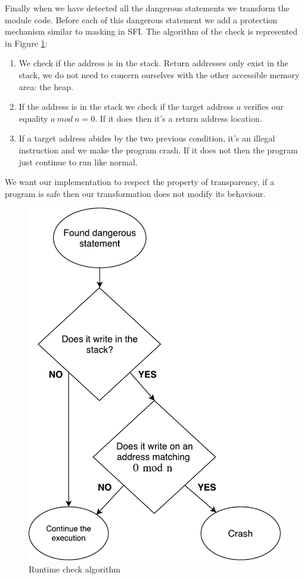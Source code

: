 \documentclass[11pt]{sdm}
\begin{document}
Finally when we have detected all the dangerous statements we transform the module code. Before each of this dangerous statement we add a protection mechanism similar to masking in SFI. The algorithm of the check is represented in Figure \ref{runtime_check}: \\
	\begin{enumerate}
		\item We check if the address is in the stack. Return addresses only exist in the stack, we do not need to concern ourselves with the other accessible memory area: the heap.
		\item If the address is in the stack we check if the target address $a$ verifies our equality $a~mod~n=0$. If it does then it's a return address location.
		\item If a target address abides by the two previous condition, it's an illegal instruction and we make the program crash. If it does not then the program just continue to run like normal.
	\end{enumerate}
We want our implementation to respect the property of transparency, if a program is safe then our transformation does not modify its behaviour.

\begin{figure}[!ht]
\centering
\includegraphics[scale=0.6]{images/runtime_check.pdf}
\caption{Runtime check algorithm}
\label{runtime_check}
\end{figure}
\end{document}
